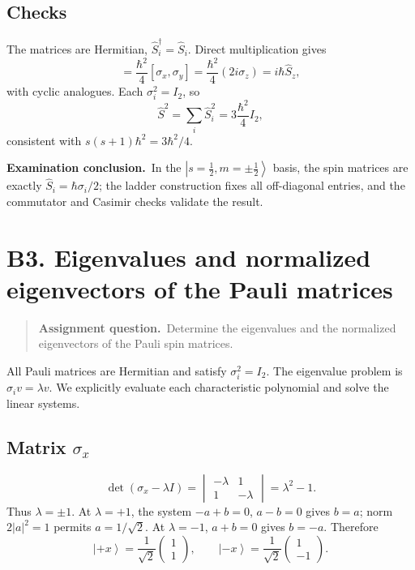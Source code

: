 \documentclass[11pt,a4paper]{article}
\theoremstyle{definition}
\newcommand{\ket}[1]{\left|#1\right\rangle}
\newenvironment{question}{\begin{quote}\small\noindent\textbf{Assignment question.}\ }{\end{quote}}
\newcommand{\exam}[1]{\par\medskip\noindent\textbf{Examination conclusion.}\ #1\par}
\begin{document}
\subsection{Checks}
The matrices are Hermitian, \(\hat S_i^\dagger=\hat S_i\). Direct multiplication gives
\begin{equation}
[\hat S_x,\hat S_y]=\frac{\hbar^2}{4}[\sigma_x,\sigma_y]
=\frac{\hbar^2}{4}(2i\sigma_z)=i\hbar\hat S_z,
\end{equation}
with cyclic analogues. Each \(\sigma_i^2=I_2\), so
\begin{equation}
\hat S^2=\sum_i\hat S_i^2=3\frac{\hbar^2}{4}I_2,
\end{equation}
consistent with \(s(s+1)\hbar^2=3\hbar^2/4\).
\exam{In the \(\ket{s=\frac12,m=\pm\frac12}\) basis, the spin matrices are exactly \(\hat S_i=\hbar\sigma_i/2\); the ladder construction fixes all off-diagonal entries, and the commutator and Casimir checks validate the result.}

\section{B3. Eigenvalues and normalized eigenvectors of the Pauli matrices}
\begin{question}Determine the eigenvalues and the normalized eigenvectors of the Pauli spin matrices.\end{question}
All Pauli matrices are Hermitian and satisfy \(\sigma_i^2=I_2\). The eigenvalue problem is \(\sigma_i v=\lambda v\). We explicitly evaluate each characteristic polynomial and solve the linear systems.
\subsection{Matrix \(\sigma_x\)}
\begin{equation}
\det(\sigma_x-\lambda I)=\begin{vmatrix}-\lambda&1\\1&-\lambda\end{vmatrix}=\lambda^2-1.
\end{equation}
Thus \(\lambda=\pm1\). At \(\lambda=+1\), the system \(-a+b=0\), \(a-b=0\) gives \(b=a\); norm \(2|a|^2=1\) permits \(a=1/\sqrt2\). At \(\lambda=-1\), \(a+b=0\) gives \(b=-a\). Therefore
\begin{equation}
\boxed{\ket{+x}=\frac1{\sqrt2}\begin{pmatrix}1\\1\end{pmatrix},\qquad
\ket{-x}=\frac1{\sqrt2}\begin{pmatrix}1\\-1\end{pmatrix}.}
\end{equation}
\end{document}
